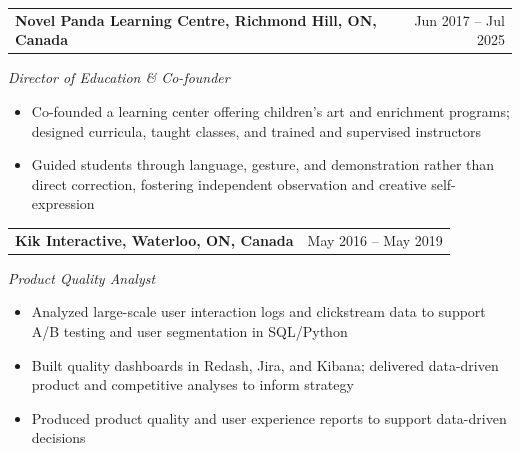 \documentclass[10.5pt,letterpaper]{article}
\makeatletter
\newcommand{\entrydate}[2]{%
  \noindent\begin{tabularx}{\textwidth}{@{}X r@{}}
    \textbf{#1} & #2
  \end{tabularx}\vspace{-2pt}%
}
\newcommand{\entrysub}[1]{\noindent\textit{#1}\par}
\makeatother
\begin{document}

\entrydate{Novel Panda Learning Centre, Richmond Hill, ON, Canada}{Jun 2017 -- Jul 2025}
\entrysub{Director of Education \& Co-founder}
\begin{itemize}[leftmargin=14pt, nosep, topsep=2pt]
  \item Co-founded a learning center offering children's art and enrichment programs; designed curricula, taught classes, and trained and supervised instructors
  \item Guided students through language, gesture, and demonstration rather than direct correction, fostering independent observation and creative self-expression
\end{itemize}
\vspace{3pt}

\entrydate{Kik Interactive, Waterloo, ON, Canada}{May 2016 -- May 2019}
\entrysub{Product Quality Analyst}
\begin{itemize}[leftmargin=14pt, nosep, topsep=2pt]
  \item Analyzed large-scale user interaction logs and clickstream data to support A/B testing and user segmentation in SQL/Python
  \item Built quality dashboards in Redash, Jira, and Kibana; delivered data-driven product and competitive analyses to inform strategy
  \item Produced product quality and user experience reports to support data-driven decisions
\end{itemize}
\vspace{3pt}
\end{document}
